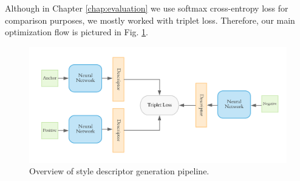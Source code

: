 Although in Chapter \ref{chap:evaluation} we use softmax cross-entropy loss for comparison purposes, we mostly worked with triplet loss.  Therefore, our main optimization flow is pictured in Fig. \ref{fig:triplet_overall}.

\begin{figure}[hbpt]
	\centering
	\includegraphics[width=\linewidth]{imgs/triplet_loss_architecture.pdf}
	\caption{Overview of style descriptor generation pipeline.}
	\label{fig:triplet_overall}
\end{figure}